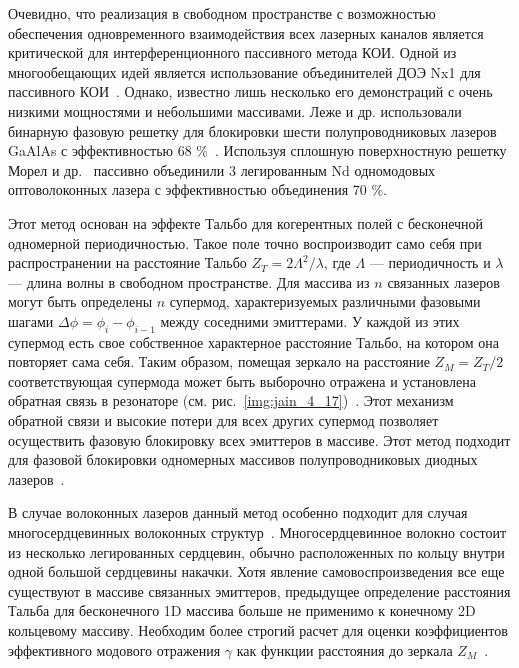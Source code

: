 Очевидно, что реализация в свободном пространстве с возможностью обеспечения одновременного взаимодействия всех лазерных каналов является критической для интерференционного пассивного метода КОИ. Одной из многообещающих идей является использование объединителей ДОЭ Nx1 для пассивного КОИ~\cite{Jain37, Jain135, Jain153, Jain154}. Однако, известно лишь несколько его демонстраций с очень низкими мощностями и небольшими массивами. Леже и др. использовали бинарную фазовую решетку для блокировки шести полупроводниковых лазеров GaAlAs с эффективностью 68 \%~\cite{Jain154}. Используя сплошную поверхностную решетку Морел и др.~\cite{Jain135} пассивно объединили 3 легированным Nd одномодовых оптоволоконных лазера с эффективностью объединения 70 \%.


Этот метод основан на эффекте Тальбо для когерентных полей с бесконечной одномерной периодичностью. Такое поле точно воспроизводит само себя при распространении на расстояние Тальбо $Z_T=2\Lambda^2/\lambda$, где $\Lambda$ --- периодичность и $\lambda$ --- длина волны в свободном пространстве. Для массива из $n$ связанных лазеров могут быть определены $n$ супермод, характеризуемых различными фазовыми шагами $\Delta\phi=\phi_i-\phi_{i-1}$ между соседними эмиттерами. У каждой из этих супермод есть свое собственное характерное расстояние Тальбо, на котором она повторяет сама себя. Таким образом, помещая зеркало на расстояние $Z_M=Z_T/2$ соответствующая супермода может быть выборочно отражена и установлена обратная связь в резонаторе (см. рис.~\ref{img:jain_4_17})~\cite{Jain155}. Этот механизм обратной связи и высокие потери для всех других супермод позволяет осуществить фазовую блокировку всех эмиттеров в массиве. Этот метод подходит для фазовой блокировки одномерных массивов полупроводниковых диодных лазеров~\cite{Jain156}.

В случае волоконных лазеров данный метод особенно подходит для случая многосердцевинных волоконных структур~\cite{Jain155, Jain157,Jain158,Jain159,Jain160}. Многосердцевинное волокно состоит из несколько легированных сердцевин, обычно расположенных по кольцу внутри одной большой сердцевины накачки. Хотя явление самовоспроизведения все еще существуют в массиве связанных эмиттеров, предыдущее определение расстояния Тальба для бесконечного 1D массива больше не применимо к конечному 2D кольцевому массиву. Необходим более строгий расчет для оценки коэффициентов эффективного модового отражения $\gamma$ как функции расстояния до зеркала $Z_M$~\cite{Jain157}.

